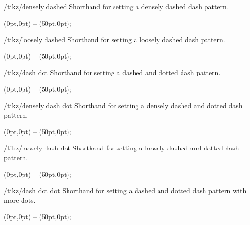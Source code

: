 \begin{stylekey}{/tikz/densely dashed}
  Shorthand for setting a densely dashed dash pattern.

\begin{codeexample}[]
\tikz {} (0pt,0pt) -- (50pt,0pt);
\end{codeexample}
\end{stylekey}

\begin{stylekey}{/tikz/loosely dashed}
  Shorthand for setting a loosely dashed dash pattern.

\begin{codeexample}[]
\tikz {} (0pt,0pt) -- (50pt,0pt);
\end{codeexample}
\end{stylekey}


\begin{stylekey}{/tikz/dash dot}
  Shorthand for setting a dashed and dotted dash pattern.

\begin{codeexample}[]
\tikz {} (0pt,0pt) -- (50pt,0pt);
\end{codeexample}
\end{stylekey}

\begin{stylekey}{/tikz/densely dash dot}
  Shorthand for setting a densely dashed and dotted dash pattern.

\begin{codeexample}[]
\tikz {} (0pt,0pt) -- (50pt,0pt);
\end{codeexample}
\end{stylekey}

\begin{stylekey}{/tikz/loosely dash dot}
  Shorthand for setting a loosely dashed and dotted dash pattern.

\begin{codeexample}[]
\tikz {} (0pt,0pt) -- (50pt,0pt);
\end{codeexample}
\end{stylekey}


\begin{stylekey}{/tikz/dash dot dot}
  Shorthand for setting a dashed and dotted dash pattern with more dots.

\begin{codeexample}[]
\tikz {} (0pt,0pt) -- (50pt,0pt);
\end{codeexample}
\end{stylekey}

